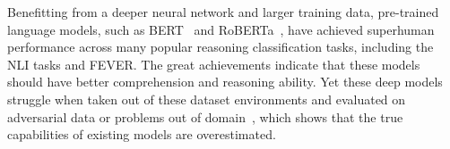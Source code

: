 


Benefitting from a deeper neural 
network and larger training data, 
pre-trained language 
models, such as BERT~\cite{devlin2018bert} and RoBERTa~\cite{liu2019roberta}, 
have achieved superhuman 
performance across many popular reasoning classification tasks, 
including the NLI tasks and FEVER. 
The great achievements indicate that these models should have better comprehension 
and reasoning ability. Yet these deep models 
struggle when taken out of these dataset environments and evaluated
on adversarial data or problems out of domain~\cite{naik2018stress,mccoy2019right,schuster2019towards,nie2019adversarial},
which shows that the true capabilities of existing models are 
overestimated. 


